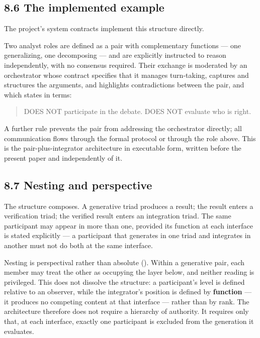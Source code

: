 \subsection*{8.6 The implemented example}
\label{sec:en:8.6}

The project's system contracts implement this structure directly.

Two analyst roles are defined as a pair with complementary functions — one generalizing, one decomposing — and are explicitly instructed to reason independently, with no consensus required. Their exchange is moderated by an orchestrator whose contract specifies that it manages turn-taking, captures and structures the arguments, and highlights contradictions between the pair, and which states in terms:

\begin{quote}
DOES NOT participate in the debate. DOES NOT evaluate who is right.
\end{quote}
A further rule prevents the pair from addressing the orchestrator directly; all communication flows through the formal protocol or through the role above. This is the pair-plus-integrator architecture in executable form, written before the present paper and independently of it.


\subsection*{8.7 Nesting and perspective}
\label{sec:en:8.7}

The structure composes. A generative triad produces a result; the result enters a verification triad; the verified result enters an integration triad. The same participant may appear in more than one, provided its function at each interface is stated explicitly — a participant that generates in one triad and integrates in another must not do both at the same interface.

Nesting is perspectival rather than absolute (). Within a generative pair, each member may treat the other as occupying the layer below, and neither reading is privileged. This does not dissolve the structure: a participant's level is defined relative to an observer, while the integrator's position is defined by \textbf{function} — it produces no competing content at that interface — rather than by rank. The architecture therefore does not require a hierarchy of authority. It requires only that, at each interface, exactly one participant is excluded from the generation it evaluates.

